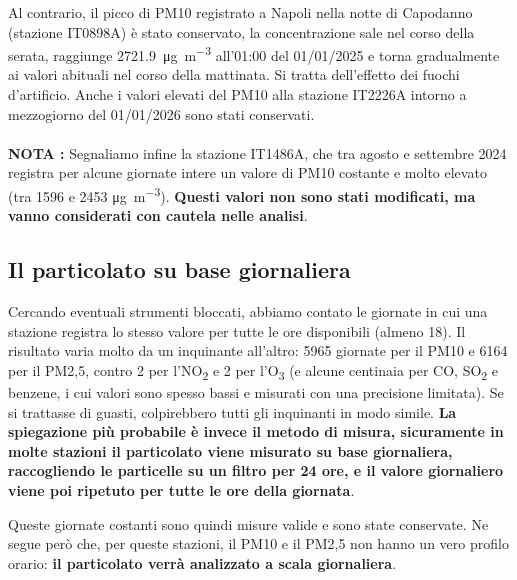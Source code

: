 \documentclass[11pt]{report}
\newcommand{\ugm}{\si{\micro\gram\per\cubic\metre}}
\begin{document}
Al contrario, il picco di PM10 registrato a Napoli nella notte di Capodanno
(stazione IT0898A) è stato conservato, la concentrazione sale nel corso della
serata, raggiunge \SI{2721,9}{\micro\gram\per\cubic\metre} all'01:00 del
01/01/2025 e torna gradualmente ai valori abituali nel corso della mattinata.
Si tratta dell'effetto dei fuochi d'artificio. Anche i valori elevati del PM10 alla stazione
IT2226A intorno a mezzogiorno del 01/01/2026 sono stati conservati.

\paragraph{}
\textbf{NOTA :} Segnaliamo infine la stazione IT1486A, che tra agosto e settembre 2024 registra
per alcune giornate intere un valore di PM10 costante e molto elevato (tra
\num{1596} e \num{2453} \ugm). \textbf{Questi valori non sono stati modificati, ma
vanno considerati con cautela nelle analisi}.

\subsection{Il particolato su base giornaliera}
Cercando eventuali strumenti bloccati, abbiamo contato le giornate in cui una
stazione registra lo stesso valore per tutte le ore disponibili (almeno 18). Il
risultato varia molto da un inquinante all'altro: \num{5965} giornate per il
PM10 e \num{6164} per il PM2,5, contro 2 per l'NO\textsubscript{2} e 2 per
l'O\textsubscript{3} (e alcune centinaia per CO, SO\textsubscript{2} e benzene,
i cui valori sono spesso bassi e misurati con una precisione limitata). Se si
trattasse di guasti, colpirebbero tutti gli inquinanti in modo simile. \textbf{La
spiegazione più probabile è invece il metodo di misura, sicuramente in molte stazioni il
particolato viene misurato su base giornaliera, raccogliendo le particelle su
un filtro per 24 ore, e il valore giornaliero viene poi ripetuto per tutte le
ore della giornata}.

Queste giornate costanti sono quindi misure valide e sono state conservate. Ne
segue però che, per queste stazioni, il PM10 e il PM2,5 non hanno un vero
profilo orario: \textbf{il particolato verrà analizzato a scala giornaliera}.
\end{document}
